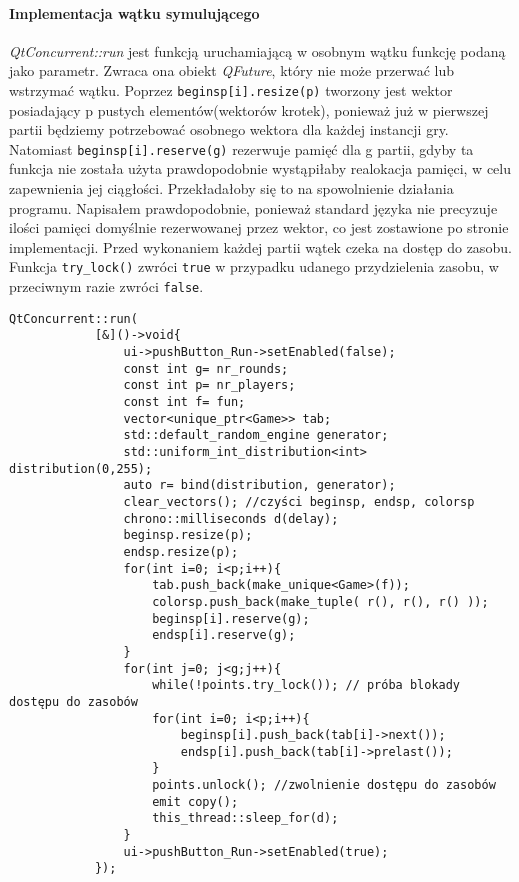 \paragraph{Implementacja wątku symulującego} \textit{QtConcurrent::run} jest funkcją uruchamiającą w osobnym wątku funkcję podaną jako parametr. Zwraca ona obiekt \textit{QFuture}, który nie może przerwać lub wstrzymać wątku. Poprzez \texttt{beginsp[i].resize(p)} tworzony jest wektor posiadający p pustych elementów(wektorów krotek), ponieważ już w pierwszej partii będziemy potrzebować osobnego wektora dla każdej instancji gry. Natomiast \texttt{beginsp[i].reserve(g)} rezerwuje pamięć dla g partii, gdyby ta funkcja nie została użyta prawdopodobnie wystąpiłaby realokacja pamięci, w celu zapewnienia jej ciągłości. Przekładałoby się to na spowolnienie działania programu. Napisałem prawdopodobnie, ponieważ standard języka nie precyzuje ilości pamięci domyślnie rezerwowanej przez wektor, co jest zostawione po stronie implementacji. Przed wykonaniem każdej partii wątek czeka na dostęp do zasobu. Funkcja \texttt{try\_lock()} zwróci \texttt{true} w przypadku udanego przydzielenia zasobu, w przeciwnym razie zwróci \texttt{false}. 
\begin{lstlisting}
QtConcurrent::run(
            [&]()->void{
                ui->pushButton_Run->setEnabled(false);
                const int g= nr_rounds;
                const int p= nr_players;
                const int f= fun;
                vector<unique_ptr<Game>> tab;
                std::default_random_engine generator;
                std::uniform_int_distribution<int> distribution(0,255);
                auto r= bind(distribution, generator);
                clear_vectors(); //czyści beginsp, endsp, colorsp
                chrono::milliseconds d(delay);
                beginsp.resize(p);
                endsp.resize(p);
                for(int i=0; i<p;i++){
                    tab.push_back(make_unique<Game>(f));
                    colorsp.push_back(make_tuple( r(), r(), r() ));
                    beginsp[i].reserve(g);
                    endsp[i].reserve(g);
                }
                for(int j=0; j<g;j++){
                    while(!points.try_lock()); // próba blokady dostępu do zasobów
                    for(int i=0; i<p;i++){
                        beginsp[i].push_back(tab[i]->next());
                        endsp[i].push_back(tab[i]->prelast());
                    }
                    points.unlock(); //zwolnienie dostępu do zasobów
                    emit copy();
                    this_thread::sleep_for(d);
                }
                ui->pushButton_Run->setEnabled(true);
            });
\end{lstlisting}

